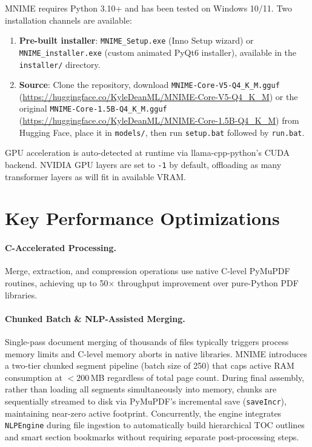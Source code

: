 \documentclass[11pt]{article}
\begin{document}
MNIME requires Python 3.10+ and has been tested on Windows 10/11.
Two installation channels are available:
\begin{enumerate}
    \item \textbf{Pre-built installer}: \texttt{MNIME\_Setup.exe}
    (Inno Setup wizard) or \texttt{MNIME\_installer.exe} (custom animated
    PyQt6 installer), available in the \texttt{installer/} directory.
    \item \textbf{Source}: Clone the repository, download
    \texttt{MNIME-Core-V5-Q4\_K\_M.gguf} (\url{https://huggingface.co/KyleDeanML/MNIME-Core-V5-Q4_K_M}) or the original \texttt{MNIME-Core-1.5B-Q4\_K\_M.gguf} (\url{https://huggingface.co/KyleDeanML/MNIME-Core-1.5B-Q4_K_M}) from Hugging Face,
    place it in \texttt{models/}, then run \texttt{setup.bat} followed by
    \texttt{run.bat}.
\end{enumerate}

GPU acceleration is auto-detected at runtime via llama-cpp-python's CUDA
backend. NVIDIA GPU layers are set to \texttt{-1} by default, offloading as
many transformer layers as will fit in available VRAM.

\section{Key Performance Optimizations}
\label{app:perf}

\paragraph{C-Accelerated Processing.}
Merge, extraction, and compression operations use native C-level PyMuPDF
routines, achieving up to 50$\times$ throughput improvement over pure-Python
PDF libraries.

\paragraph{Chunked Batch \& NLP-Assisted Merging.}
Single-pass document merging of thousands of files typically triggers process memory limits and C-level memory aborts in native libraries. MNIME introduces a two-tier chunked segment pipeline (batch size of 250) that caps active RAM consumption at $<200$\,MB regardless of total page count. During final assembly, rather than loading all segments simultaneously into memory, chunks are sequentially streamed to disk via PyMuPDF's incremental save (\texttt{saveIncr}), maintaining near-zero active footprint. Concurrently, the engine integrates \texttt{NLPEngine} during file ingestion to automatically build hierarchical TOC outlines and smart section bookmarks without requiring separate post-processing steps.
\end{document}
